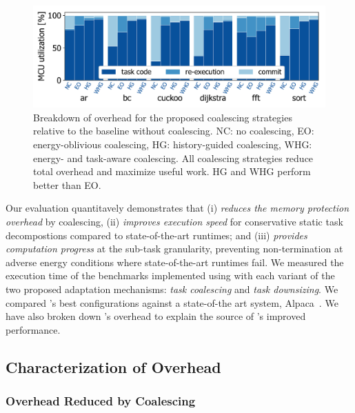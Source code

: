 \begin{figure}
	\centering
	\includegraphics[width=\columnwidth]{figures/coalEfficiency}
    \caption{Breakdown of overhead for the proposed coalescing strategies
relative to the baseline without coalescing.
NC: no coalescing, EO: energy-oblivious coalescing, HG: history-guided coalescing, WHG:
energy- and task-aware coalescing. All coalescing strategies reduce total
overhead and maximize useful work. HG and WHG perform better than EO.}
	\label{fig:overallOverheadBreakdown}
\end{figure}

Our evaluation quantitavely demonstrates that \sys (i) \emph{reduces the memory
protection overhead} by coalescing, (ii) \emph{improves execution speed} for
conservative static task decompostions compared to state-of-the-art runtimes; %
and (iii) \emph{provides computation progress} at the sub-task granularity,
preventing non-termination at adverse energy conditions where state-of-the-art
runtimes fail. We measured the execution time of the benchmarks implemented
using \sys with each variant of the two proposed adaptation mechanisms:
\emph{task coalescing} and \emph{task downsizing}. We compared \sys's best
configurations against a state-of-the art system, Alpaca~\cite{alpaca}. We have
also broken down \sys's overhead to explain the source of \sys's improved
performance.

\subsection{Characterization of Overhead}
\label{sec:coala_overhead}


\subsubsection{Overhead Reduced by Coalescing}
\label{sec:overhead-coalescing}

